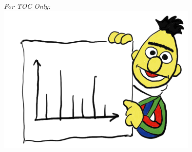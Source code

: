 \documentclass[10pt,a4paper]{article}
\begin{document}




\newpage
{\em For TOC Only:}\\[2em]
\centering
    \includegraphics[width=10cm]{./img/bert.png}
\end{document}
